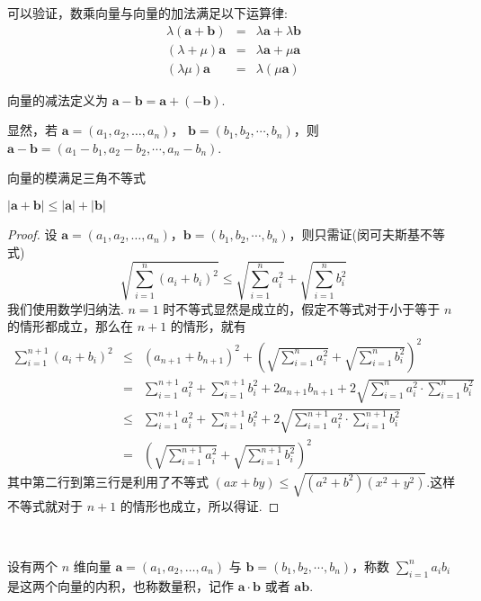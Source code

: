 可以验证，数乘向量与向量的加法满足以下运算律:
\begin{eqnarray*}
  \lambda (\bm{a}+\bm{b}) & = & \lambda \bm{a}+ \lambda
  \bm{b}\\
  (\lambda + \mu) \bm{a} & = & \lambda \bm{a}+ \mu \bm{a}\\
  (\lambda \mu) \bm{a} & = & \lambda (\mu \bm{a})
\end{eqnarray*}
\begin{definition}
  向量的减法定义为 $\bm{a}-\bm{b}=\bm{a}+
  (-\bm{b})$.
\end{definition}

显然，若 $\bm{a}= (a_1, a_2 , \ldots, a_n)$， $\bm{b}= (b_1, b_2, \cdots, b_n)$，则 $\bm{a}-\bm{b}= (a_1 - b_1, a_2 - b_2, \cdots, a_n - b_n)$.

向量的模满足三角不等式

\begin{theorem}
  $| \bm{a}+\bm{b} | \leqslant | \bm{a} | + | \bm{b}|$
\end{theorem}

\begin{proof}
  设 $\bm{a}= (a_1, a_2 , \ldots, a_n)$，$\bm{b}= (b_1,
  b_2, \cdots, b_n)$，则只需证(闵可夫斯基不等式)
  \[ \sqrt{\sum_{i = 1}^n (a_i + b_i)^2} \leqslant \sqrt{\sum_{i = 1}^n a_i^2}
     + \sqrt{\sum_{i = 1}^n b_i^2} \]
  我们使用数学归纳法. $n = 1$
  时不等式显然是成立的，假定不等式对于小于等于 $n$
  的情形都成立，那么在 $n + 1$ 的情形，就有
  \begin{eqnarray*}
    \sum_{i = 1}^{n + 1} (a_i + b_i)^2 & \leqslant & (a_{n + 1} + b_{n + 1})^2
    + \left( \sqrt{\sum_{i = 1}^n a_i^2} + \sqrt{\sum_{i = 1}^n b_i^2}
    \right)^2\\
    & = & \sum_{i = 1}^{n + 1} a_i^2 + \sum_{i = 1}^{n + 1} b_i^2 + 2 a_{n +
    1} b_{n + 1} + 2 \sqrt{\sum_{i = 1}^n a_i^2 \cdot \sum_{i = 1}^n b_i^2}\\
    & \leqslant & \sum_{i = 1}^{n + 1} a_i^2 + \sum_{i = 1}^{n + 1} b_i^2 + 2
    \sqrt{\sum_{i = 1}^{n + 1} a_i^2 \cdot \sum_{i = 1}^{n + 1} b_i^2}\\
    & = & \left( \sqrt{\sum_{i = 1}^{n + 1} a_i^2} + \sqrt{\sum_{i = 1}^{n +
    1} b_i^2} \right)^2
  \end{eqnarray*}
  其中第二行到第三行是利用了不等式 $(a x + b y) \leqslant
  \sqrt{(a^2 + b^2) (x^2 + y^2)}$.这样不等式就对于 $n + 1$
  的情形也成立，所以得证.
\end{proof}

\

\begin{definition}
  设有两个 $n$ 维向量 $\bm{a}= (a_1, a_2 , \ldots, a_n)$
  与 $\bm{b}= (b_1, b_2, \cdots, b_n)$，称数 $\sum_{i = 1}^n a_i
  b_i$ 是这两个向量的内积，也称数量积，记作 $\bm{a}
  \cdot \bm{b}$ 或者 $\bm{a}\bm{b}$. 
\end{definition}

